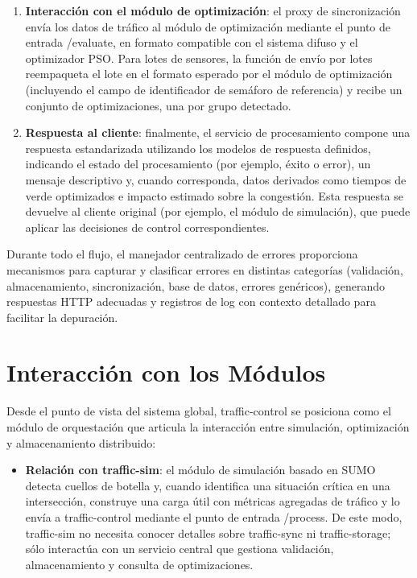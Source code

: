 \begin{enumerate}
    \item \textbf{Interacción con el módulo de optimización}: el proxy de sincronización envía los datos de tráfico al módulo de optimización mediante el punto de entrada /evaluate, en formato compatible con el sistema difuso y el optimizador PSO. Para lotes de sensores, la función de envío por lotes reempaqueta el lote en el formato esperado por el módulo de optimización (incluyendo el campo de identificador de semáforo de referencia) y recibe un conjunto de optimizaciones, una por grupo detectado.
    \item \textbf{Respuesta al cliente}: finalmente, el servicio de procesamiento compone una respuesta estandarizada utilizando los modelos de respuesta definidos, indicando el estado del procesamiento (por ejemplo, éxito o error), un mensaje descriptivo y, cuando corresponda, datos derivados como tiempos de verde optimizados e impacto estimado sobre la congestión. Esta respuesta se devuelve al cliente original (por ejemplo, el módulo de simulación), que puede aplicar las decisiones de control correspondientes.
\end{enumerate}

Durante todo el flujo, el manejador centralizado de errores proporciona mecanismos para capturar y clasificar errores en distintas categorías (validación, almacenamiento, sincronización, base de datos, errores genéricos), generando respuestas HTTP adecuadas y registros de log con contexto detallado para facilitar la depuración.

\section{Interacción con los Módulos}
\label{subsec:traffic_control_integration}

Desde el punto de vista del sistema global, traffic-control se posiciona como el módulo de orquestación que articula la interacción entre simulación, optimización y almacenamiento distribuido:

\begin{itemize}
    \item \textbf{Relación con traffic-sim}: el módulo de simulación basado en SUMO detecta cuellos de botella y, cuando identifica una situación crítica en una intersección, construye una carga útil con métricas agregadas de tráfico y lo envía a traffic-control mediante el punto de entrada /process. De este modo, traffic-sim no necesita conocer detalles sobre traffic-sync ni traffic-storage; sólo interactúa con un servicio central que gestiona validación, almacenamiento y consulta de optimizaciones.
\end{itemize}

